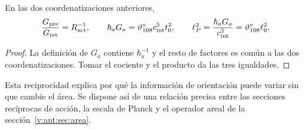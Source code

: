 \begin{proposition}
En las dos coordenatizaciones anteriores,
\[
\frac{G_{\rm pre}}{G_{\rm ret}}=R_{\rm act}^{-1},\qquad
\hbar_aG_a=\vartheta^\circ_{108}c_{\rm int}^5t_0^2,
\qquad
\ell_P^2=\frac{\hbar_aG_a}{c_{\rm int}^3}
=\vartheta^\circ_{108}\ell_0^2.
\]
\end{proposition}
\begin{proof}
La definición de $G_a$ contiene $\hbar_a^{-1}$ y el resto de factores
es común a las dos coordenatizaciones. Tomar el cociente y el producto da
las tres igualdades.
\end{proof}
Esta reciprocidad explica por qué la información de orientación puede
variar sin que cambie el área. Se dispone así de una relación precisa
entre las secciones recíprocas de acción, la escala de Planck y el operador areal
de la sección~\ref{v:ant:sec:area}.

